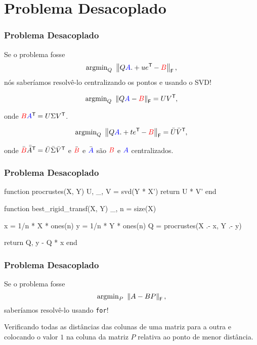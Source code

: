 
\section{Problema Desacoplado}

\begin{frame}[fragile]
  \frametitle{Problema Desacoplado}

  \begin{center}
    Se o problema fosse \[\text{argmin}_{Q}\,\, \left\lVert Q\textcolor{blue}{A} .+ u e^{\mathsf{T}\mkern-1mu} - \textcolor{red}{B}\right\rVert_\mathsf{F},\] nós saberíamos resolvê-lo centralizando os pontos e usando o SVD!

  \pause

  \[\text{argmin}_{Q}\,\, \left\lVert Q\textcolor{blue}{A} - \textcolor{red}{B}\right\rVert_\mathsf{F} = U V^{\mathsf{T}\mkern-1mu},\]

  onde $\textcolor{red}{B} \textcolor{blue}{A}^{\mathsf{T}\mkern-1mu} = U \Sigma V^{\mathsf{T}\mkern-1mu}$.

  \pause

  \[\text{argmin}_{Q}\,\, \left\lVert Q\textcolor{blue}{A} .+ t e^{\mathsf{T}\mkern-1mu} - \textcolor{red}{B}\right\rVert_\mathsf{F} = \bar{U} \bar{V}^{\mathsf{T}\mkern-1mu},\]

  onde $\bar{\textcolor{red}{B}} \bar{\bar{A}}^{\mathsf{T}\mkern-1mu} = \bar{U} \bar{\Sigma} \bar{V}^{\mathsf{T}\mkern-1mu}$ e $\bar{\textcolor{red}{B}}$ e $\bar{\textcolor{blue}{A}}$ são $\textcolor{red}{B}$ e $\textcolor{blue}{A}$ centralizados.
  \end{center}
\end{frame}

\begin{frame}[fragile]
  \frametitle{Problema Desacoplado}
  \begin{code}
    function procrustes(X, Y)
      U, _, V = svd(Y * X')
      return U * V'
    end
  \end{code}
  \pause
  \begin{code}
    function best_rigid_transf(X, Y)
      _, n = size(X)

      x = 1/n * X * ones(n)
      y = 1/n * Y * ones(n)
      Q = procrustes(X .- x, Y .- y)

      return Q, y - Q * x
    end
  \end{code}
\end{frame}

\begin{frame}[fragile]
  \frametitle{Problema Desacoplado}

  \begin{center}
    Se o problema fosse \[\text{argmin}_{P}\,\, \left\lVert A - BP\right\rVert_\mathsf{F},\] saberíamos resolvê-lo usando \texttt{for}!

    \pause
    \vspace{1cm}
    Verificando todas as distâncias das colunas de uma matriz para a outra e colocando o valor $1$ na coluna da matriz $P$ relativa ao ponto de menor distância.
  \end{center}
\end{frame}

